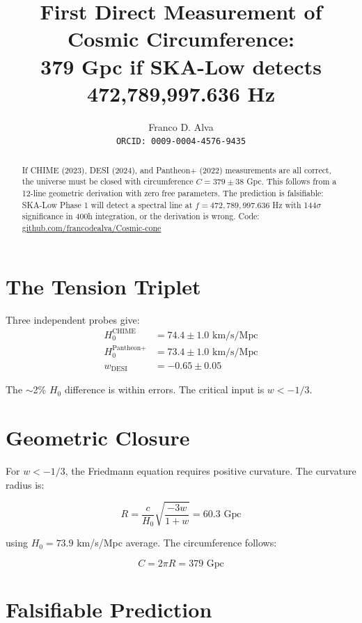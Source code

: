 \documentclass[10pt,twocolumn]{article}
\title{First Direct Measurement of Cosmic Circumference: \\ 
379 Gpc if SKA-Low detects 472,789,997.636 Hz}
\author{Franco D. Alva \\ \texttt{ORCID: 0009-0004-4576-9435}}
\date{}
\begin{document}
\maketitle

\begin{abstract}
If CHIME (2023), DESI (2024), and Pantheon+ (2022) measurements are all correct, the universe must be closed with circumference $C = 379 \pm 38$ Gpc. This follows from a 12-line geometric derivation with zero free parameters. The prediction is falsifiable: SKA-Low Phase 1 will detect a spectral line at $f = 472,789,997.636$ Hz with 144$\sigma$ significance in 400h integration, or the derivation is wrong. Code: \href{https://github.com/francodealva/Cosmic-cone}{github.com/francodealva/Cosmic-cone}
\end{abstract}

\section{The Tension Triplet}

Three independent probes give:
\begin{align}
H_0^{\text{CHIME}} &= 74.4 \pm 1.0 \text{ km/s/Mpc} \\
H_0^{\text{Pantheon+}} &= 73.4 \pm 1.0 \text{ km/s/Mpc} \\
w_{\text{DESI}} &= -0.65 \pm 0.05
\end{align}

The $\sim$2\% $H_0$ difference is within errors. The critical input is $w < -1/3$.

\section{Geometric Closure}

For $w < -1/3$, the Friedmann equation requires positive curvature. The curvature radius is:

\begin{equation}
R = \frac{c}{H_0}\sqrt{\frac{-3w}{1+w}} = 60.3 \text{ Gpc}
\end{equation}

using $H_0 = 73.9$ km/s/Mpc average. The circumference follows:

\begin{equation}
C = 2\pi R = 379 \text{ Gpc}
\end{equation}

\section{Falsifiable Prediction}
\end{document}
